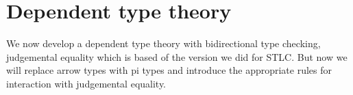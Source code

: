 \section{Dependent type theory}

We now develop a dependent type theory with bidirectional type checking, judgemental equality which is based of the version we did for STLC. But now we will replace arrow types with pi types and introduce the appropriate rules for interaction with judgemental equality.
